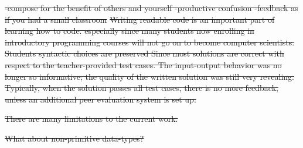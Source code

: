 \documentclass[12pt,twoside]{mitthesis}
\providecommand{\DIFdeltex}[1]{{\protect\color{red}\sout{#1}}}                      %
\providecommand{\DIFdel}[1]{\texorpdfstring{\DIFdeltex{#1}}{}} %
\begin{document}
\DIFdel{-compose for the benefit of others and yourself
-productive confusion
-feedback as if you had a small classroom
}%
\DIFdel{Writing readable code is an important part of learning how to code. especially since many students now enrolling in introductory programming courses will not go on to become computer scientists. Students syntactic choices are preserved
Since most solutions are correct with respect to the teacher-provided test cases. The input-output behavior was no longer so informative; the quality of the written solution was still very revealing. Typically, when the solution passes all test cases, there is no more feedback, unless an additional peer evaluation system is set up.
}%


\DIFdel{There are many limitations to the current work. 
}%

\DIFdel{What about non-primitive data-types?
}%





\end{document}
